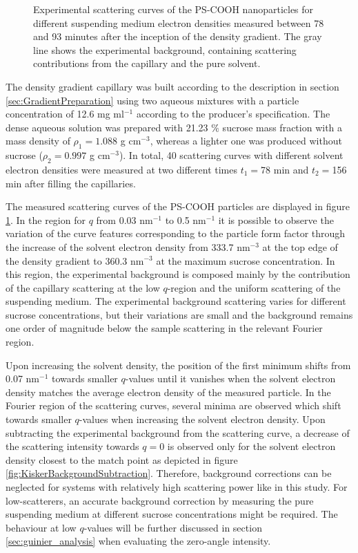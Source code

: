 \begin{figure}%
	\centering
		
		\caption[Experimental scattering curves of the PS-COOH particles for different suspending medium electron densities.]{Experimental scattering curves of the PS-COOH nanoparticles for different suspending medium electron densities measured between 78 and 93 minutes after the inception of the density gradient. The gray line shows the experimental background, containing scattering contributions from the capillary and the pure solvent.}
		\label{fig:KiskerContinuousSAXS}
\end{figure}

The density gradient capillary was built according to the description in section \ref{sec:GradientPreparation} using two aqueous mixtures with a particle concentration of 12.6 mg ml$^{-1}$ according to the producer's specification. The dense aqueous solution was prepared with 21.23 $\%$ sucrose mass fraction with a mass density of \(\rho_1=1.088 \) g cm$^{-3}$, whereas a lighter one was produced without sucrose (\(\rho_2=0.997 \) g cm$^{-3}$). In total, 40 scattering curves with different solvent electron densities were measured at two different times \(t_1=\)78 min and \(t_2=\)156 min after filling the capillaries.

The measured scattering curves of the PS-COOH particles are displayed in figure \ref{fig:KiskerContinuousSAXS}. In the region for \(q\) from 0.03 nm\(^{-1}\) to 0.5 nm\(^{-1}\) it is possible to observe the variation of the curve features corresponding to the particle form factor through the increase of the solvent electron density from 333.7 nm\(^{-3}\) at the top edge of the density gradient to 360.3 nm\(^{-3}\) at the maximum sucrose concentration. In this region, the experimental background is composed mainly by the contribution of the capillary scattering at the low $q$-region and the uniform scattering of the suspending medium. The experimental background scattering varies for different sucrose concentrations, but their variations are small and the background remains one order of magnitude below the sample scattering in the relevant Fourier region.

Upon increasing the solvent density, the position of the first minimum shifts from 0.07 nm\(^{-1}\) towards smaller \(q\)-values until it vanishes when the solvent electron density matches the average electron density of the measured particle. In the Fourier region of the scattering curves, several minima are observed which shift towards smaller \(q\)-values when increasing the solvent electron density. Upon subtracting the experimental background from the scattering curve, a decrease of the scattering intensity towards $q=0$ is observed only for the solvent electron density closest to the match point as depicted in figure \ref{fig:KiskerBackgroundSubtraction}. Therefore, background corrections can be neglected for systems with relatively high scattering power like in this study. For low-scatterers, an accurate background correction by measuring the pure suspending medium at different sucrose concentrations might be required. The behaviour at low $q$-values will be further discussed in section \ref{sec:guinier_analysis} when evaluating the zero-angle intensity.

